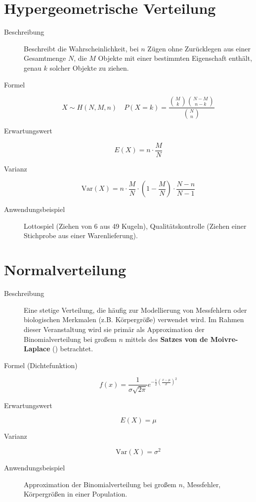 \section{Hypergeometrische Verteilung}
\begin{description}
    \item[Beschreibung] Beschreibt die Wahrscheinlichkeit, bei \(n\) Zügen ohne Zurücklegen aus einer Gesamtmenge \(N\), die \(M\) Objekte mit einer bestimmten Eigenschaft enthält, genau \(k\) solcher Objekte zu ziehen.
    \item[Formel] \[ X \sim H(N, M, n) \quad P(X=k) = \frac{\binom{M}{k} \binom{N-M}{n-k}}{\binom{N}{n}} \]
    \item[Erwartungswert] \[ E(X) = n \cdot \frac{M}{N} \]
    \item[Varianz] \[ \text{Var}(X) = n \cdot \frac{M}{N} \cdot \left(1 - \frac{M}{N}\right) \cdot \frac{N-n}{N-1} \]
    \item[Anwendungsbeispiel] Lottospiel (Ziehen von 6 aus 49 Kugeln), Qualitätskontrolle (Ziehen einer Stichprobe aus einer Warenlieferung).
\end{description}

\section{Normalverteilung}
\begin{description}
    \item[Beschreibung] Eine stetige Verteilung, die häufig zur Modellierung von Messfehlern oder biologischen Merkmalen (z.B. Körpergröße) verwendet wird. Im Rahmen dieser Veranstaltung wird sie primär als Approximation der Binomialverteilung bei großem \(n\) mittels des \textbf{Satzes von de Moivre-Laplace} () betrachtet.
    \item[Formel (Dichtefunktion)] \[ f(x) = \frac{1}{\sigma\sqrt{2\pi}} e^{-\frac{1}{2}\left(\frac{x-\mu}{\sigma}\right)^2} \]
    \item[Erwartungswert] \[ E(X) = \mu \]
    \item[Varianz] \[ \text{Var}(X) = \sigma^2 \]
    \item[Anwendungsbeispiel] Approximation der Binomialverteilung bei großem \(n\), Messfehler, Körpergrößen in einer Population.
\end{description}